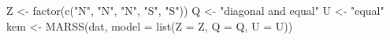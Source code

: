 \begin{Schunk}
\begin{Sinput}
 Z <- factor(c("N", "N", "N", "S", "S"))
 Q <- "diagonal and equal"
 U <- "equal"
 kem <- MARSS(dat, model = list(Z = Z, Q = Q, U = U))
\end{Sinput}
\end{Schunk}
